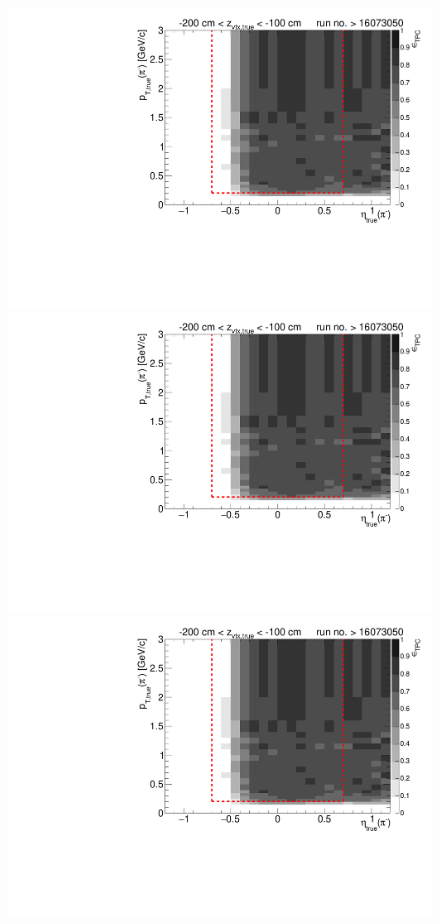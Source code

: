 \begin{figure}[hb]
{		\includegraphics[width=\linewidth,page=6]{graphics/eff/Eff2D_TPC_pion_Minus_RunRange2.pdf}\\
		\includegraphics[width=\linewidth,page=8]{graphics/eff/Eff2D_TPC_pion_Minus_RunRange2.pdf}\\
		\includegraphics[width=\linewidth,page=10]{graphics/eff/Eff2D_TPC_pion_Minus_RunRange2.pdf}
	}%
\end{figure}

